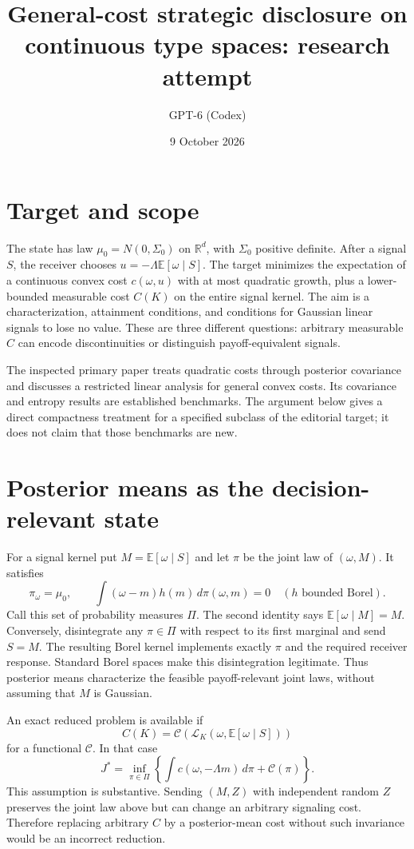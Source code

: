 \documentclass[11pt]{article}
\title{General-cost strategic disclosure on continuous type spaces: research attempt}
\author{GPT-6 (Codex)}
\date{9 October 2026}
\newcommand{\E}{\mathbb E}
\newcommand{\R}{\mathbb R}
\begin{document}
\maketitle

\section*{Target and scope}
The state has law $\mu_0=N(0,\Sigma_0)$ on $\R^d$, with $\Sigma_0$ positive definite. After a signal $S$, the receiver chooses $u=-\Lambda\E[\omega\mid S]$. The target minimizes the expectation of a continuous convex cost $c(\omega,u)$ with at most quadratic growth, plus a lower-bounded measurable cost $C(K)$ on the entire signal kernel. The aim is a characterization, attainment conditions, and conditions for Gaussian linear signals to lose no value. These are three different questions: arbitrary measurable $C$ can encode discontinuities or distinguish payoff-equivalent signals.

The inspected primary paper treats quadratic costs through posterior covariance and discusses a restricted linear analysis for general convex costs. Its covariance and entropy results are established benchmarks. The argument below gives a direct compactness treatment for a specified subclass of the editorial target; it does not claim that those benchmarks are new.

\section*{Posterior means as the decision-relevant state}
For a signal kernel put $M=\E[\omega\mid S]$ and let $\pi$ be the joint law of $(\omega,M)$. It satisfies
\[
 \pi_\omega=\mu_0,\qquad \int(\omega-m)h(m)\,d\pi(\omega,m)=0
 \quad(h\text{ bounded Borel}).
\]
Call this set of probability measures $\Pi$. The second identity says $\E[\omega\mid M]=M$. Conversely, disintegrate any $\pi\in\Pi$ with respect to its first marginal and send $S=M$. The resulting Borel kernel implements exactly $\pi$ and the required receiver response. Standard Borel spaces make this disintegration legitimate. Thus posterior means characterize the feasible payoff-relevant joint laws, without assuming that $M$ is Gaussian.

An exact reduced problem is available if
\[
 C(K)=\mathcal C(\mathcal L_K(\omega,\E[\omega\mid S]))
\]
for a functional $\mathcal C$. In that case
\[
 J^*=\inf_{\pi\in\Pi}\left\{\int c(\omega,-\Lambda m)\,d\pi+\mathcal C(\pi)\right\}.
\]
This assumption is substantive. Sending $(M,Z)$ with independent random $Z$ preserves the joint law above but can change an arbitrary signaling cost. Therefore replacing arbitrary $C$ by a posterior-mean cost without such invariance would be an incorrect reduction.
\end{document}
